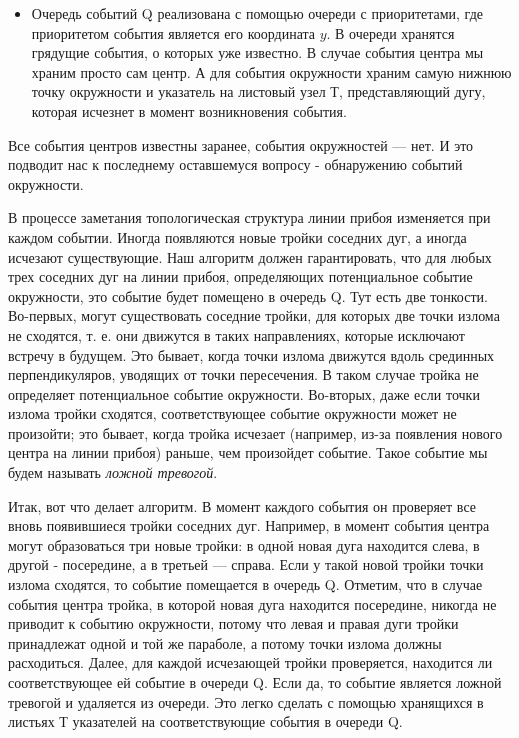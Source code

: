 \begin{itemize}
	\item Очередь  событий  Q  реализована  с  помощью  очереди  с  приоритетами,  где приоритетом  события  является  его  координата  $y$.
	В  очереди  хранятся  грядущие  события,  о  которых  уже  известно.
	В  случае  события  центра  мы  храним  просто  сам  центр.  
	А  для  события  окружности  храним  самую  нижнюю точку  окружности  и  указатель  на  листовый  узел  Т,  представляющий  дугу, которая  исчезнет  в  момент  возникновения  события.
\end{itemize}

Все  события  центров  известны  заранее,  события  окружностей --- нет.
И  это  подводит  нас  к  последнему  оставшемуся  вопросу  -  обнаружению  событий  окружности.

В  процессе  заметания  топологическая  структура  линии  прибоя  изменяется при  каждом  событии.
Иногда  появляются  новые  тройки  соседних  дуг,  а  иногда исчезают  существующие.
Наш  алгоритм  должен  гарантировать,  что  для  любых  трех  соседних  дуг  на  линии прибоя,  определяющих  потенциальное  событие  окружности,  это  событие  будет  помещено  в  очередь  Q.
Тут  есть две  тонкости.
Во-первых,  могут  существовать  соседние тройки,  для  которых  две  точки  излома  не  сходятся,  т.  е. они  движутся  в  таких  направлениях,  которые  исключают  встречу  в  будущем.  
Это  бывает,  когда  точки  излома движутся  вдоль  срединных  перпендикуляров,  уводящих  от  точки  пересечения.
В  таком  случае  тройка  не  определяет  потенциальное событие  окружности.
Во-вторых,  даже  если  точки  излома  тройки  сходятся, соответствующее  событие  окружности  может  не  произойти;  это  бывает,  когда  тройка исчезает  (например,  из-за  появления  нового  центра  на  линии  прибоя)  раньше,  чем 
произойдет  событие.
Такое  событие  мы  будем  называть  \textit{ложной  тревогой}.

Итак,  вот  что  делает  алгоритм.
В  момент  каждого  события  он  проверяет  все вновь  появившиеся  тройки  соседних  дуг.
Например,  в  момент  события  центра могут  образоваться  три  новые  тройки:  в  одной  новая  дуга  находится  слева,  в  другой  -  посередине,  а  в  третьей  ---  справа.
Если  у  такой  новой  тройки  точки  излома сходятся,  то  событие  помещается  в  очередь  Q.
Отметим,  что  в  случае  события  центра  тройка,  в  которой  новая  дуга  находится  посередине,  никогда  не  приводит  к событию  окружности,  потому  что  левая  и  правая  дуги  тройки  принадлежат  одной и  той  же  параболе,  а  потому  точки  излома  должны  расходиться.
Далее,  для  каждой  исчезающей  тройки  проверяется,  находится ли  соответствующее  ей  событие  в очереди  Q.
Если  да,  то  событие  является  ложной  тревогой  и  удаляется  из  очереди.
Это  легко  сделать  с  помощью  хранящихся  в  листьях  Т  указателей  на  соответствующие  события  в  очереди  Q.

